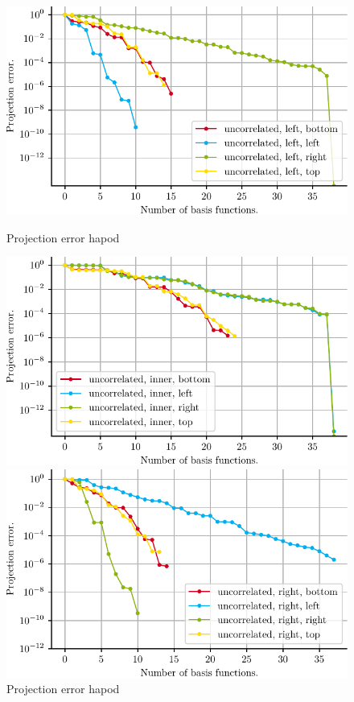 \documentclass[a4paper]{eccomas_paper-2024}
\begin{document}

\begin{figure}[!htb]
  \includegraphics[width=\linewidth]{./figures/beam/fig_proj_error_left_hapod.pdf}
  \caption{Projection error hapod}\label{fig:proj_error_left_hapod}
\endminipage\hfill
{}
  \includegraphics[width=\linewidth]{./figures/beam/fig_proj_error_inner_hapod.pdf}
  \caption{Projection error hapod}\label{fig:proj_error_inner_hapod}
\endminipage\hfill
{}%
  \includegraphics[width=\linewidth]{./figures/beam/fig_proj_error_right_hapod.pdf}

\end{figure}
\end{document}
